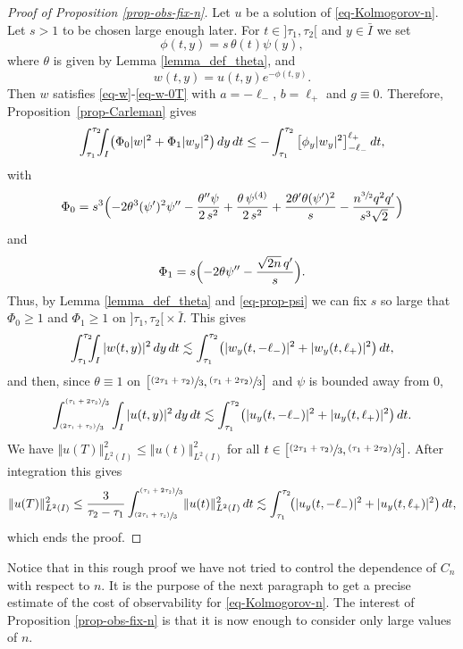 \documentclass[JEP,XML,SOM,Unicode]{cedram}
\newcommand{\psfrac}[2]{\sfrac{(#1)}{#2}}
\theoremstyle{plain}
\theoremstyle{definition}
\newcommand{\abs}[1]{\vert #1\vert}
\newcommand{\nr}[1]{\Vert #1\Vert}
\newcommand{\1}{\mathds 1}
\begin{document}
\begin{proof}[Proof of Proposition \ref{prop-obs-fix-n}]
Let $u$ be a solution of \eqref{eq-Kolmogorov-n}. Let $s >1$ to be chosen large enough later. For $t \in{}]\tau_1,\tau_2[$ and $y \in \bar I$ we set
\[
\phi(t,y) = s \, \theta(t) \psi (y),
\]
where $\theta$ is given by Lemma \ref{lemma_def_theta}, and
\[
w(t,y) = u(t,y) e^{-\phi(t,y)}.
\]
Then $w$ satisfies \eqref{eq-w}-\eqref{eq-w-0T} with $a = -\ell_-$, $b = \ell_+$ and $g \equiv 0$. Therefore,
Proposition~\ref{prop-Carleman} gives
\[
\int_{\tau_1}^{\tau_2}\hspace*{-2mm} \int_I \bigl(\Phi_0 \abs w^2 + \Phi_1 \abs{w_y}^2 \bigr) \, dy \, dt
\leq - \int_{\tau_1}^{\tau_2} \big[ \phi_y \abs{w_y}^2 \big]_{-\ell_-}^{\ell_+} \, dt,
\]
with
\begin{equation} \label{eq_Phi0_fixedn}
\Phi_0 = s^3 \Bigl(- 2 \theta^3 (\psi')^2 \psi'' - \frac {\theta'' \psi}{2\,s^2} + \frac {\theta\, \psi^{(4)}}{2\,s^2} + \frac{2\theta' \theta (\psi')^2}{s} - \frac{n^{\sfrac{3}{2}}q^2 q'}{s^3\sqrt{2}} \Bigr)
\end{equation}
and
\begin{equation} \label{eq_Phi1_fixedn}
\Phi_1 = s \Bigl(- 2 \theta \psi''- \frac{\sqrt {2n}\, q'}{s}\Bigr).
\end{equation}
Thus, by Lemma \ref{lemma_def_theta} and \eqref{eq-prop-psi} we can fix $s$ so large that $\Phi_0 \geq 1$ and $\Phi_1 \geq 1$ on $]\tau_1,\tau_2[{}\times \bar I$. This gives
\[
\int_{\tau_1}^{\tau_2}\hspace*{-2mm} \int_{I} \vert w(t,y) \vert^2 \, dy\, dt \lesssim \int_{\tau_1}^{\tau_2} \bigl(\vert w_y(t,-\ell_-) \vert^2 + \vert w_y(t,\ell_+) \vert^2 \bigr) \, dt,
\]
and then, since $\theta \equiv 1$ on $\big[\psfrac{2\tau_1 + \tau_2}{3},\psfrac{\tau_1 + 2\tau_2}{3} \big]$ and $\psi$ is bounded away from 0,
\[
\int_{\psfrac{2\tau_1 + \tau_2}{3}}^{\psfrac{\tau_1 + 2\tau_2}{3}} \int_{I} \vert u(t,y) \vert^2 \, dy\, dt \lesssim \int_{\tau_1}^{\tau_2} \bigl(\vert u_y(t,-\ell_-) \vert^2 + \vert u_y(t,\ell_+) \vert^2 \bigr) \, dt.
\]
We have $\nr{u(T)}_{L^2(I)}^2 \leq \nr{u(t)}_{L^2(I)}^2$ for all $t \in \big[\psfrac{2\tau_1 + \tau_2}{3},\psfrac{\tau_1 + 2\tau_2}{3} \big]$. After integration this gives
\[
\nr{u(T)}_{L^2(I)}^2 \leq \frac{3}{\tau_2 - \tau_1} \int_{\psfrac{2\tau_1 + \tau_2}{3}}^{\psfrac{\tau_1 + 2\tau_2}{3}}\! \nr{u(t)}_{L^2(I)}^2 \, dt \lesssim \int_{\tau_1}^{\tau_2}\! \bigl(\vert u_y(t,-\ell_-) \vert^2 + \vert u_y(t,\ell_+) \vert^2 \bigr) \, dt,
\]
which ends the proof.
\end{proof}

Notice that in this rough proof we have not tried to control the dependence of $C_n$ with respect to $n$. It is the purpose of the next paragraph to get a precise estimate of the cost of observability for \eqref{eq-Kolmogorov-n}. The interest of Proposition \ref{prop-obs-fix-n} is that it is now enough to consider only large values of $n$.
\end{document}
